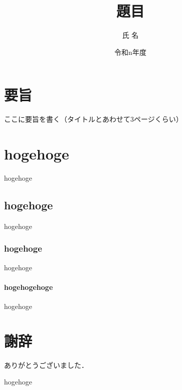 \documentclass[a4paper, 12pt, report]{jsbook}
\begin{document}
  \title{題目}
  \date{令和n年度}
  \author{氏 名}
  \maketitle{}
  \chapter*{要旨}
  ここに要旨を書く（タイトルとあわせて3ページくらい）


  \frontmatter

  \tableofcontents

  \tableofcontents

  \mainmatter
  \chapter{hogehoge}
  hogehoge

  \section{hogehoge}
  hogehoge
  
  \subsection{hogehoge}
  hogehoge
  
  \subsubsection{hogehogehoge}
  hogehoge

  \backmatter
  \chapter{謝辞}
  ありがとうございました．

  \begin{thebibliography}{}
     hogehoge
  \end{thebibliography}
\end{document}
